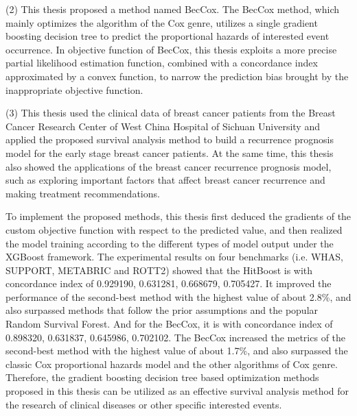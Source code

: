 \begin{englishabstract}
    (2) This thesis proposed a method named BecCox. The BecCox method, which mainly optimizes the algorithm of the Cox genre, utilizes a single gradient boosting decision tree to predict the proportional hazards of interested event occurrence. In objective function of BecCox, this thesis exploits a more precise partial likelihood estimation function, combined with a concordance index approximated by a convex function, to narrow the prediction bias brought by the inappropriate objective function.
    
    (3) This thesis used the clinical data of breast cancer patients from the Breast Cancer Research Center of West China Hospital of Sichuan University and applied the proposed survival analysis method to build a recurrence prognosis model for the early stage breast cancer patients. At the same time, this thesis also showed the applications of the breast cancer recurrence prognosis model, such as exploring important factors that affect breast cancer recurrence and making treatment recommendations.

	To implement the proposed methods, this thesis first deduced the gradients of the custom objective function with respect to the predicted value, and then realized the model training according to the different types of model output under the XGBoost framework. The experimental results on four benchmarks (i.e. WHAS, SUPPORT, METABRIC and ROTT2) showed that the HitBoost is with concordance index of 0.929190, 0.631281, 0.668679, 0.705427. It improved the performance of the second-best method with the highest value of about 2.8\%, and also surpassed methods that follow the prior assumptions and the popular Random Survival Forest. And for the BecCox, it is with concordance index of 0.898320, 0.631837, 0.645986, 0.702102. The BecCox increased the metrics of the second-best method with the highest value of about 1.7\%, and also surpassed the classic Cox proportional hazards model and the other algorithms of Cox genre. Therefore, the gradient boosting decision tree based optimization methods proposed in this thesis can be utilized as an effective survival analysis method for the research of clinical diseases or other specific interested events.

\end{englishabstract}
